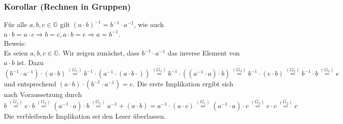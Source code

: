 \subsubsection{Korollar (Rechnen in Gruppen)}
\label{RechnenInGruppen}
Für alle $a,b,c\in\mathbb{G}$ gilt $(a\cdot b)^{-1}=b^{-1}\cdot a^{-1}$, wie auch $a\cdot b=a\cdot c\Rightarrow b=c,a\cdot b=e\Rightarrow a=b^{-1}$.\\
Beweis:\\
Es seien $a,b,c\in\mathbb{G}$.  Wir zeigen zunächst, dass $b^{-1}\cdot a^{-1}$ das inverse Element von $a\cdot b$ ist.  Dazu 
\[(b^{-1}\cdot a^{-1})\cdot(a\cdot b)\stackrel{(G_1)}{=} b^{-1}\cdot(a^{-1}\cdot(a\cdot b\cdot))\stackrel{(G_1)}{=}b^{-1}\cdot((a^{-1}\cdot a)\cdot b)\stackrel{(G_3)}{=} b^{-1}\cdot(e\cdot b)\stackrel{(G_2)}{=}b^{-1}\cdot b\stackrel{(G_3)}{=}e\]
und entsprechend $(a\cdot b)\cdot(b^{-1}\cdot a^{-1})=e$.  Die erste Implikation ergibt sich nach Voraussetzung durch 
\[b\stackrel{(G_2)}{=}e\cdot b\stackrel{(G_3)}{=}(a^{-1}\cdot a)\cdot b\stackrel{(G_1)}{=}a^{-1}+(a\cdot b)=a^{-1}\cdot(a\cdot c)\stackrel{(G_1)}{=}(a^{-1}\cdot a)\cdot c\stackrel{(G_3)}{=}e\cdot c\stackrel{(G_2)}{=}c\]
Die verbleibende Implikation sei den Leser überlassen.
